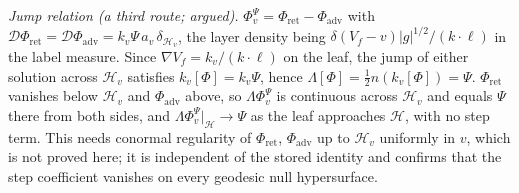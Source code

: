 \emph{Jump relation (a third route; argued).} $\Phi^{\Psi}_{v} = \Phi_{\mathrm{ret}} - \Phi_{\mathrm{adv}}$ with $\mathcal{D}\Phi_{\mathrm{ret}} = \mathcal{D}\Phi_{\mathrm{adv}} = k_{v}\Psi\,a_{v}\,\delta_{\mathcal{H}_{v}}$, the layer density being $\delta(V_{f} - v)|g|^{1/2}/(k\cdot\ell)$ in the label measure. Since $\nabla V_{f} = k_{v}/(k\cdot\ell)$ on the leaf, the jump of either solution across $\mathcal{H}_{v}$ satisfies $k_{v}[\Phi] = k_{v}\Psi$, hence $\Lambda[\Phi] = \tfrac12 n(k_{v}[\Phi]) = \Psi$. $\Phi_{\mathrm{ret}}$ vanishes below $\mathcal{H}_{v}$ and $\Phi_{\mathrm{adv}}$ above, so $\Lambda\Phi^{\Psi}_{v}$ is continuous across $\mathcal{H}_{v}$ and equals $\Psi$ there from both sides, and $\Lambda\Phi^{\Psi}_{v}|_{\mathcal{H}} \to \Psi$ as the leaf approaches $\mathcal{H}$, with no step term. This needs conormal regularity of $\Phi_{\mathrm{ret}}$, $\Phi_{\mathrm{adv}}$ up to $\mathcal{H}_{v}$ uniformly in $v$, which is not proved here; it is independent of the stored identity and confirms that the step coefficient vanishes on every geodesic null hypersurface.

